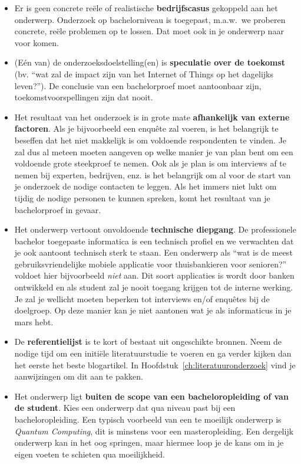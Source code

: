 \begin{itemize}
  \item Er is geen concrete reële of realistische \textbf{bedrijfscasus} gekoppeld aan het onderwerp. Onderzoek op bachelorniveau is toegepast, m.a.w.~we proberen concrete, reële problemen op te lossen. Dat moet ook in je onderwerp naar voor komen.
  \item (Eén van) de onderzoeksdoelstelling(en) is \textbf{speculatie over de toekomst} (bv. ``wat zal de impact zijn van het Internet of Things op het dagelijks leven?''). De conclusie van een bachelorproef moet aantoonbaar zijn, toekomstvoorspellingen zijn dat nooit.
  \item Het resultaat van het onderzoek is in grote mate \textbf{afhankelijk van externe factoren}. Als je bijvoorbeeld een enquête zal voeren, is het belangrijk te beseffen dat het niet makkelijk is om voldoende respondenten te vinden. Je zal dus al meteen moeten aangeven op welke manier je van plan bent om een voldoende grote steekproef te nemen. Ook als je plan is om interviews af te nemen bij experten, bedrijven, enz. is het belangrijk om al voor de start van je onderzoek de nodige contacten te leggen. Als het immers niet lukt om tijdig de nodige personen te kunnen spreken, komt het resultaat van je bachelorproef in gevaar.
  \item Het onderwerp vertoont onvoldoende \textbf{technische diepgang}. De professionele bachelor toegepaste informatica is een technisch profiel en we verwachten dat je ook aantoont technisch sterk te staan. Een onderwerp als ``wat is de meest gebruiksvriendelijke mobiele applicatie voor thuisbankieren voor senioren?'' voldoet hier bijvoorbeeld \textit{niet} aan. Dit soort applicaties is wordt door banken ontwikkeld en als student zal je nooit toegang krijgen tot de interne werking. Je zal je wellicht moeten beperken tot interviews en/of enquêtes bij de doelgroep. Op deze manier kan je niet aantonen wat je als informaticus in je mars hebt.
  \item De \textbf{referentielijst} is te kort of bestaat uit ongeschikte bronnen. Neem de nodige tijd om een initiële literatuurstudie te voeren en ga verder kijken dan het eerste het beste blogartikel. In Hoofdstuk~\ref{ch:literatuuronderzoek} vind je aanwijzingen om dit aan te pakken.
  \item Het onderwerp ligt \textbf{buiten de scope van een bacheloropleiding of van de student}. Kies een onderwerp dat qua niveau past bij een bacheloropleiding. Een typisch voorbeeld van een te moeilijk onderwerp is \textit{Quantum Computing}, dit is minstens voor een masteropleiding. Een dergelijk onderwerp kan in het oog springen, maar hiermee loop je de kans om in je eigen voeten te schieten qua moeilijkheid.
\end{itemize}

